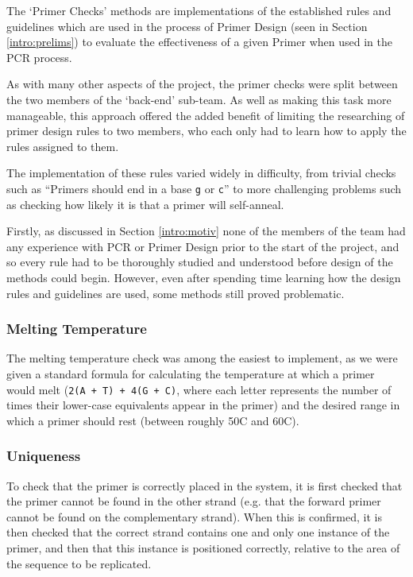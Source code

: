 The `Primer Checks' methods are implementations of the established rules
and guidelines which are used in the process of Primer Design (seen in
Section \ref{intro:prelims}) to evaluate the effectiveness of a given 
Primer when used in the PCR process.

As with many other aspects of the project, the primer checks were split
between the two members of the `back-end' sub-team. As well as making
this task more manageable, this approach offered the added benefit of
limiting the researching of primer design rules to two members, who each
only had to learn how to apply the rules assigned to them.

The implementation of these rules varied widely in difficulty, from
trivial checks such as ``Primers should end in a base \verb£g£ or \verb£c£'' 
to more challenging problems such as checking how likely it is that a primer  
will self-anneal.

Firstly, as discussed in Section \ref{intro:motiv} none of the members of 
the team had any experience with PCR or Primer Design prior to the start of 
the project, and so every rule had to be thoroughly studied and understood 
before design of the methods could begin. However, even after spending time 
learning how the design rules and guidelines are used, some methods still 
proved problematic.

\subsubsection{Melting Temperature}
The melting temperature check was among the easiest to implement, as we
were given a standard formula for calculating the temperature at which a 
primer would melt (\texttt{2(A + T) + 4(G + C)}, where each letter
represents the number of times their lower-case equivalents appear in
the primer) and the desired range in which a primer should rest
(between roughly 50\degree C and 60\degree C).

\subsubsection{Uniqueness}
To check that the primer is correctly placed in the system, it is first checked
that the primer cannot be found in the other strand (e.g. that the forward
primer cannot be found on the complementary strand). When this is confirmed,
it is then checked that the correct strand contains one and only one instance
of the primer, and then that this instance is positioned correctly, relative
to the area of the sequence to be replicated.

